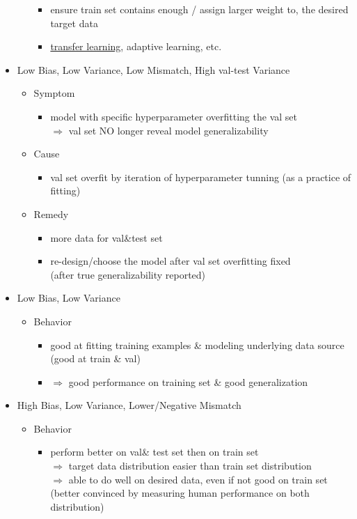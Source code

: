 \begin{itemize}
\begin{itemize}
\begin{itemize}
		\item ensure train set contains enough / assign larger weight to, the desired target data
		\item \hyperref[DL_Learning_Transfer]{transfer learning}, adaptive learning, etc.
		\end{itemize}
	\end{itemize}
\item Low Bias, Low Variance, Low Mismatch, High val-test Variance
	\begin{itemize}
	\item Symptom
		\begin{itemize}
		\item model with specific hyperparameter overfitting the val set \\
		$\Rightarrow$ val set NO longer reveal model generalizability
		\end{itemize}
	\item Cause
		\begin{itemize}
		\item val set overfit by iteration of hyperparameter tunning (as a practice of fitting)
		\end{itemize}
	\item Remedy
		\begin{itemize}
		\item more data for val\&test set
		\item re-design/choose the model after val set overfitting fixed \\ 
		(after true generalizability reported)
		\end{itemize}
	\end{itemize}
	
\item Low Bias, Low Variance
	\begin{itemize}
	\item Behavior
		\begin{itemize}
		\item good at fitting training examples \& modeling underlying data source \\ 
		(good at train \& val)
		\item $\Rightarrow$ good performance on training set \& good generalization
		\end{itemize}
	\end{itemize}
\item High Bias, Low Variance, Lower/Negative Mismatch
	\begin{itemize}
	\item Behavior
		\begin{itemize}
		\item perform better on val\& test set then on train set \\
		$\Rightarrow$ target data distribution easier than train set distribution \\
		$\Rightarrow$ able to do well on desired data, even if not good on train set \\
		(better convinced by measuring human performance on both distribution)
		\end{itemize}
	\end{itemize}
\end{itemize}

